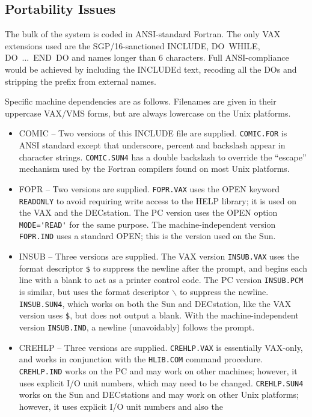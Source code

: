 \subsection{Portability Issues}
The bulk of the system is coded in ANSI-standard Fortran.  The only
VAX extensions used are the SGP/16-sanctioned
INCLUDE, DO~WHILE, DO~...~END~DO and names longer than
6 characters.  Full ANSI-compliance would be achieved by including
the INCLUDEd text, recoding
all the DOs and stripping the prefix  from
external names.

Specific machine dependencies are as follows.  Filenames are given
in their uppercase VAX/VMS forms, but are always lowercase on
the Unix platforms.
\begin{itemize}
\item COMIC -- Two versions of this INCLUDE file are supplied.
\verb|COMIC.FOR| is ANSI standard except that underscore, percent and
backslash appear in character strings.  \verb|COMIC.SUN4| has a double
backslash to override the ``escape'' mechanism used by the Fortran
compilers found on most Unix platforms.
\item FOPR -- Two versions are supplied.  \verb|FOPR.VAX| uses
the OPEN keyword \verb|READONLY| to avoid requiring
write access to the HELP library;  it is used on the VAX and
the DECstation.  The PC version uses the OPEN option
\verb|MODE='READ'| for the same
purpose.  The machine-independent version \verb|FOPR.IND| uses a
standard OPEN;  this is the version used on the Sun.
\item INSUB -- Three versions are supplied.  The VAX version
\verb|INSUB.VAX| uses
the format descriptor \verb|$| to suppress the newline after the
prompt, and begins each line with a blank to act as a printer
control code.  The PC version \verb|INSUB.PCM| is similar, but uses the
format descriptor $\backslash$ to suppress the newline.
\verb|INSUB.SUN4|, which works on both the Sun and DECstation,
like the VAX version uses \verb|$|, but does not output
a blank.
With the machine-independent version \verb|INSUB.IND|, a newline (unavoidably)
follows the prompt.
\item CREHLP -- Three versions are supplied.  \verb|CREHLP.VAX| is essentially
VAX-only, and works in conjunction with the \verb|HLIB.COM| command procedure.
\verb|CREHLP.IND| works on the PC and may work on other machines;  however,
it uses explicit I/O unit numbers, which may need to be changed.
\verb|CREHLP.SUN4| works on the Sun and DECstations and may work on other Unix
platforms;  however, it uses explicit I/O unit numbers and also the

\end{itemize}
